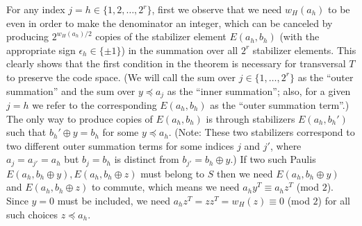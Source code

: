 \documentclass[twoside,romanappendices]{IEEEtran}
\begin{document}
For any index $j = h \in \{ 1,2,\ldots,2^r \}$, first we observe that we need $w_H(a_h)$ to be even in order to make the denominator an integer, which can be canceled by producing $2^{w_H(a_h)/2}$ copies of the stabilizer element $E(a_h,b_h)$ (with the appropriate sign $\epsilon_h \in \{ \pm 1 \}$) in the summation over all $2^r$ stabilizer elements.
This clearly shows that the first condition in the theorem is necessary for transversal $T$ to preserve the code space.
(We will call the sum over $j \in \{1,\ldots,2^r\}$ as the ``outer summation'' and the sum over $y \preceq a_j$ as the ``inner summation''; also, for a given $j = h$ we refer to the corresponding $E(a_h,b_h)$ as the ``outer summation term''.)
The only way to produce copies of $E(a_h,b_h)$ is through stabilizers $E(a_h,b_h')$ such that $b_h' \oplus y = b_h$ for some $y \preceq a_h$.
(Note: These two stabilizers correspond to two different outer summation terms for some indices $j$ and $j'$, where $a_j = a_{j'} = a_h$ but $b_j = b_h$ is distinct from $b_{j'} = b_h \oplus y$.)
If two such Paulis $E(a_h, b_h \oplus y), E(a_h, b_h \oplus z)$ must belong to $S$ then we need $E(a_h,b_h \oplus y)$ and $E(a_h,b_h \oplus z)$ to commute, which means we need $a_h y^T \equiv a_h z^T$ (mod $2$).
Since $y = 0$ must be included, we need $a_h z^T = zz^T = w_H(z) \equiv 0$ (mod $2$) for all such choices $z \preceq a_h$.
\end{document}

